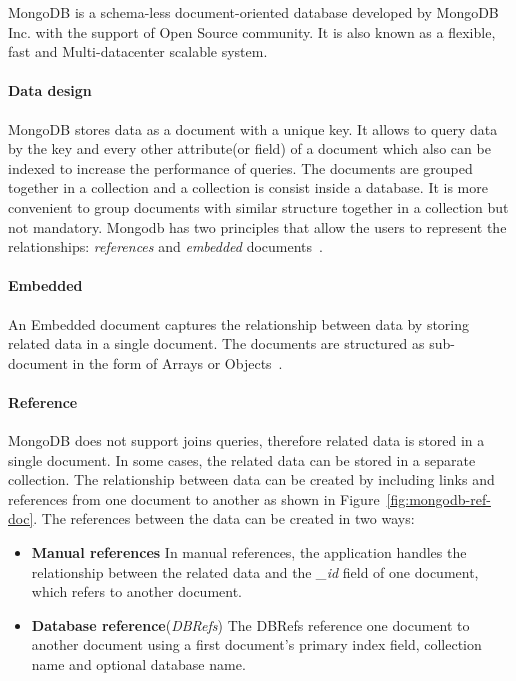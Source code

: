 MongoDB is a schema-less document-oriented database developed by MongoDB Inc. with the support of Open Source community. It is also known as a flexible, fast and Multi-datacenter scalable system.
\paragraph{Data design} 
MongoDB stores data as a document with a unique key. It allows to query data by the key and every other attribute(or field) of a document which also can be indexed to increase the performance of queries. The documents are grouped together in a collection and a collection is consist inside a database. It is more convenient to group documents with similar structure together in a collection but not mandatory. Mongodb has two principles that allow the users to represent the relationships: \textit{references} and \textit{embedded} documents~\citep{mongodb:org}. 

\paragraph{Embedded}\label{mongo:embedded}
An Embedded document captures the relationship between data by storing related data in a single document. The documents are structured as sub-document in the form of Arrays or Objects~\citep{nosql/comparision}. 

\paragraph{Reference}
MongoDB does not support joins queries, therefore related data is stored in a single document. In some cases, the related data can be stored in a separate collection. The relationship between data can be created by including links and references from one document to another as shown in Figure~\ref{fig:mongodb-ref-doc}.  The references between the data can be created in two ways:
\begin{itemize}
	\item {\textbf{Manual references}}
		In manual references, the application handles the relationship between the related data and the \textit{\_id} field of one document, which refers to another document. 
	\item \textbf{Database reference}(\textit{DBRefs})
	The DBRefs reference one document to another document using a first document's primary index field, collection name and optional database name. 

\end{itemize}

